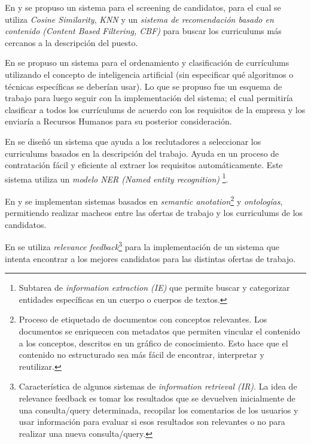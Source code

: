\documentclass[12pt,a4paper]{article}
\begin{document}
\begin{sloppypar}
En \cite{trabajos_relacionados_7} y \cite{trabajos_relacionados_8} se propuso un sistema para el screening de candidatos, para el cual se utiliza \textit{Cosine Similarity}, \textit{KNN} y un \textit{sistema de recomendación basado en contenido (Content Based Filtering, CBF)} para buscar los curriculums más cercanos a la descripción del puesto.

En \cite{trabajos_relacionados_9} se propuso un sistema para el ordenamiento y clasificación de currículums utilizando el concepto de inteligencia artificial (sin especificar qué algoritmos o técnicas específicas se deberían usar). Lo que se propuso fue un esquema de trabajo para luego seguir con la implementación del sistema; el cual permitiría clasificar a todos los currículums de acuerdo con los requisitos de la empresa y los enviaría a Recursos Humanos para su posterior consideración.

En \cite{trabajos_relacionados_10} se diseñó un sistema que ayuda a los reclutadores a seleccionar los curriculums basados en la descripción del trabajo. Ayuda en un proceso de contratación fácil y eficiente al extraer los requisitos automáticamente. Este sistema utiliza un \textit{modelo NER (Named entity recognition)} \footnote{Subtarea de \textit{information extraction (IE)} que permite buscar y categorizar entidades específicas en un cuerpo o cuerpos de textos.}.

En \cite{trabajos_relacionados_11} y \cite{trabajos_relacionados_12} se implementan sistemas basados en \textit{semantic anotation}\footnote{Proceso de etiquetado de documentos con conceptos relevantes. Los documentos se enriquecen con metadatos que permiten vincular el contenido a los conceptos, descritos en un gráfico de conocimiento. Esto hace que el contenido no estructurado sea más fácil de encontrar, interpretar y reutilizar.} y \textit{ontologías}, permitiendo realizar macheos entre las ofertas de trabajo y los curriculums de los candidatos.

En \cite{trabajos_relacionados_13} se utiliza \textit{relevance feedback}\footnote{Característica de algunos sistemas de \textit{information retrieval (IR)}. La idea de relevance feedback es tomar los resultados que se devuelven inicialmente de una consulta/query determinada, recopilar los comentarios de los usuarios y usar información para evaluar si esos resultados son relevantes o no para realizar una nueva consulta/query.} para la implementación de un sistema que intenta encontrar a los mejores candidatos para las distintas ofertas de trabajo.


\end{sloppypar}
\end{document}
